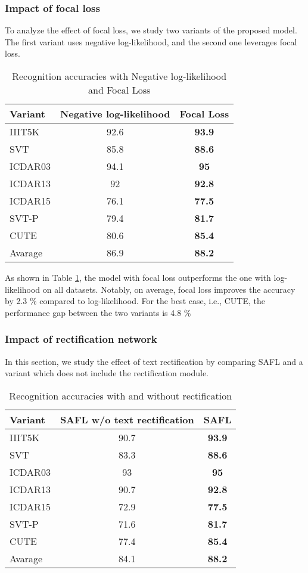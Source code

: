 \subsubsection{Impact of focal loss}
To analyze the effect of focal loss, we study two variants of the proposed model. The first variant uses negative log-likelihood, and the second one leverages focal loss. 
\begin{table}[h]
\centering
\caption{Recognition accuracies with Negative log-likelihood and Focal Loss}
\label{tab:loss}
\begin{tabular}{|l|cc|}
\hline
\textbf{Variant} & \textbf{Negative log-likelihood} & \textbf{Focal Loss} \\ \hline
IIIT5K  & 92.6     & \textbf{93.9}\\
SVT  & 85.8     & \textbf{88.6}\\
ICDAR03 & 94.1     & \textbf{95}\\
ICDAR13 & 92& \textbf{92.8}\\
ICDAR15 & 76.1     & \textbf{77.5}\\
SVT-P& 79.4     & \textbf{81.7}\\
CUTE & 80.6     & \textbf{85.4}\\ \hline
Avarage & 86.9 & \textbf{88.2}\\ \hline

\end{tabular}
\end{table}
\par As shown in Table \ref{tab:loss}, the model with focal loss outperforms the one with log-likelihood on all datasets. Notably, on average, focal loss improves the accuracy by 2.3 \% compared to log-likelihood. For the best case, i.e., CUTE, the performance gap between the two variants is 4.8 \%
\subsubsection{Impact of rectification network}
In this section, we study the effect of text rectification by comparing SAFL and a variant which does not include the rectification module. 
\begin{table}[h]
\centering
\caption{Recognition accuracies with and without rectification}
\label{tab:withoutrec}
\begin{tabular}{|l|cc|}
\hline
\textbf{Variant} & \textbf{SAFL w/o text rectification} & \textbf{SAFL} \\ \hline
IIIT5K  & 90.7   & \textbf{93.9}\\
SVT  & 83.3    & \textbf{88.6}\\
ICDAR03 & 93     & \textbf{95}\\
ICDAR13 & 90.7& \textbf{92.8}\\
ICDAR15 & 72.9     & \textbf{77.5}\\
SVT-P& 71.6    & \textbf{81.7}\\
CUTE & 77.4     & \textbf{85.4}\\ \hline
Avarage & 84.1 & \textbf{88.2}\\ \hline

\end{tabular}
\end{table}

